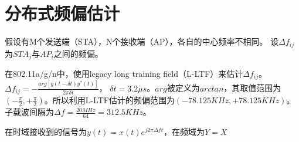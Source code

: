 
\section{分布式频偏估计}

假设有M个发送端（STA），N个接收端（AP），各自的中心频率不相同。
设$\Delta f_{ij}$为$STA_{j}$与$AP_{i}$之间的频偏。

在802.11a/g/n中，使用legacy long training field（L-LTF）来估计$\Delta f_{ij}$。
$\Delta f_{ij} = -\frac{arg[ y(t - \delta t)y^{*}(t)  ]}{2 \pi \delta t}$， $\delta t = 3.2 \mu s$。$arg$被定义为$arctan$，其取值范围为$(-\frac{\pi}{2}, +\frac{\pi}{2})$。所以利用L-LTF估计的频偏范围为$(-78.125KHz, +78.125KHz)$。
子载波间隔为$\Delta f = \frac{20MHz}{64} = 312.5KHz$。

在时域接收到的信号为$y(t)=x(t) e^{j2 \pi \Delta f t}$，在频域为$Y = X$